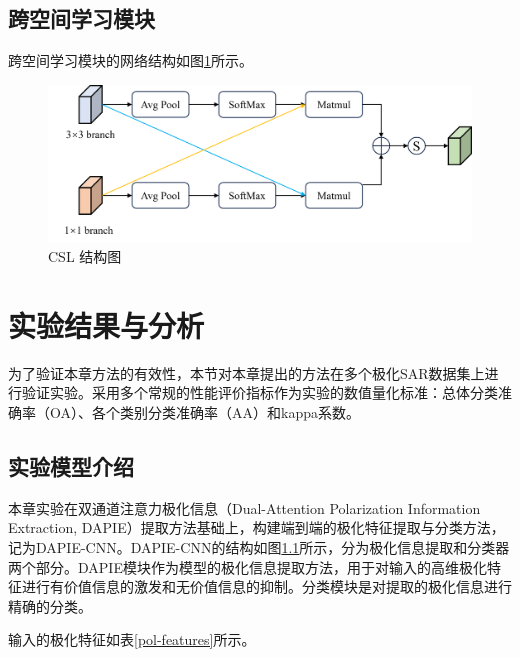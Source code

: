 \subsection{跨空间学习模块}
跨空间学习模块的网络结构如图\ref{DPEN_CSL}所示。
\begin{figure}[h]
    \centering
    \includegraphics[width=14cm]{pic/chapter3/DPEN_CSL.png}
    \caption{CSL 结构图}
    \label{DPEN_CSL}
\end{figure}

\section{实验结果与分析}
为了验证本章方法的有效性，本节对本章提出的方法在多个极化SAR数据集上进行验证实验。采用多个常规的性能评价指标作为实验的数值量化标准：总体分类准确率（OA）、各个类别分类准确率（AA）和kappa系数。
\subsection{实验模型介绍}
本章实验在双通道注意力极化信息（Dual-Attention Polarization Information Extraction, DAPIE）提取方法基础上，构建端到端的极化特征提取与分类方法，记为DAPIE-CNN。DAPIE-CNN的结构如图\ref{}所示，分为极化信息提取和分类器两个部分。DAPIE模块作为模型的极化信息提取方法，用于对输入的高维极化特征进行有价值信息的激发和无价值信息的抑制。分类模块是对提取的极化信息进行精确的分类。

输入的极化特征如表\ref{pol-features}所示。
\begin{table}[ht]
    \caption{使用的极化特征列表}
    \label{pol-features}
\end{table}

